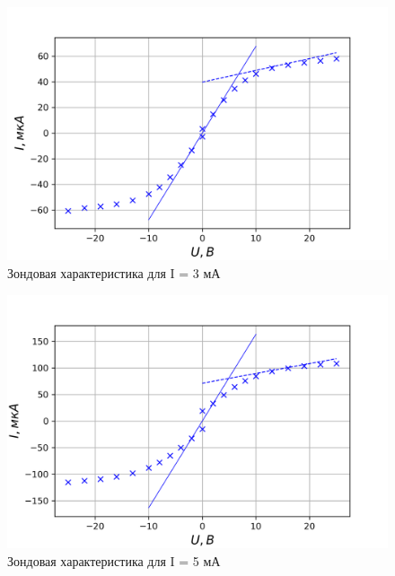 \documentclass[a4paper, 12pt]{article}
\begin{document}
\begin{figure}[h!]
\begin{center}
\includegraphics{Zond2.png}
\end{center}
\caption{Зондовая характеристика для I = 3 мА}
\label{Zond2_graph}
\end{figure}

\begin{figure}[h!]
\begin{center}
\includegraphics{Zond3.png}
\end{center}
\caption{Зондовая характеристика для I = 5 мА}
\label{Zond3_graph}
\end{figure}
\end{document}
